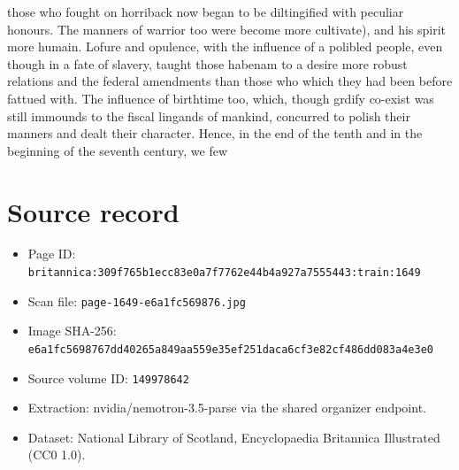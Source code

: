\documentclass{article}
\begin{document}
those who fought on horriback now began to be diltingified with peculiar honours. The manners of warrior too were become more cultivate), and his spirit more humain. Lofure and opulence, with the influence of a polibled people, even though in a fate of slavery, taught those habenam to a desire more robust relations and the federal amendments than those who which they had been before fattued with. The influence of birthtime too, which, though grdify co-exist was still immounds to the fiscal lingands of mankind, concurred to polish their manners and dealt their character. Hence, in the end of the tenth and in the beginning of the seventh century, we few

\section*{Source record}
\begin{itemize}
\item Page ID: \texttt{britannica:309f765b1ecc83e0a7f7762e44b4a927a7555443:train:1649}
\item Scan file: \texttt{page-1649-e6a1fc569876.jpg}
\item Image SHA-256: \texttt{e6a1fc5698767dd40265a849aa559e35ef251daca6cf3e82cf486dd083a4e3e0}
\item Source volume ID: \texttt{149978642}
\item Extraction: nvidia/nemotron-3.5-parse via the shared organizer endpoint.
\item Dataset: National Library of Scotland, Encyclopaedia Britannica Illustrated (CC0 1.0).
\end{itemize}
\end{document}
